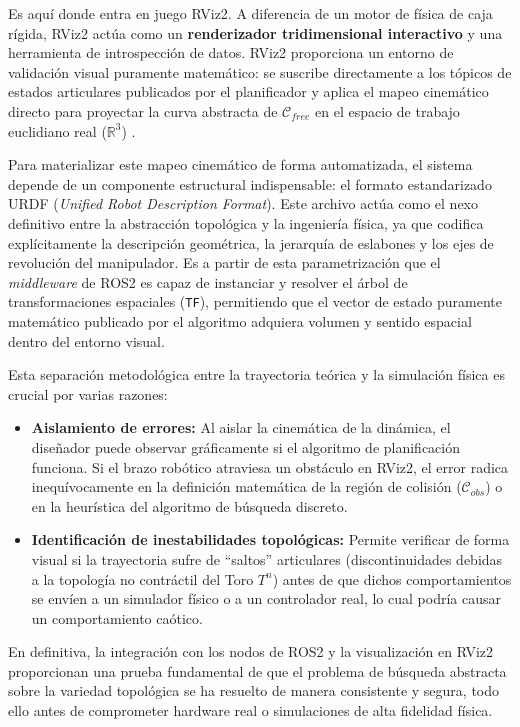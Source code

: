 Es aquí donde entra en juego RViz2. A diferencia de un motor de física de caja rígida, 
RViz2 actúa como un \textbf{renderizador tridimensional interactivo} y una herramienta de 
introspección de datos. RViz2 proporciona un entorno de validación visual puramente 
matemático: se suscribe directamente a los tópicos de estados articulares publicados 
por el planificador y aplica el mapeo cinemático directo para proyectar la curva abstracta 
de $\mathcal{C}_{free}$ en el espacio de trabajo euclidiano real ($\mathbb{R}^3$) \parencite{chitta2012moveit}.

Para materializar este mapeo cinemático de forma automatizada, el sistema depende de un 
componente estructural indispensable: el formato estandarizado URDF (\textit{Unified Robot 
Description Format}). Este archivo actúa como el nexo definitivo entre la abstracción topológica 
y la ingeniería física, ya que codifica explícitamente la descripción geométrica, la 
jerarquía de eslabones y los ejes de revolución del manipulador. Es a partir de esta parametrización 
que el \textit{middleware} de ROS2 es capaz de instanciar y resolver el árbol de 
transformaciones espaciales (\texttt{TF}), permitiendo que el vector de estado puramente 
matemático publicado por el algoritmo adquiera volumen y sentido espacial dentro del entorno visual.

Esta separación metodológica entre la trayectoria teórica y la simulación física es crucial 
por varias razones:
\begin{itemize}
\item \textbf{Aislamiento de errores:} Al aislar la cinemática de la dinámica, el diseñador puede 
observar gráficamente si el algoritmo de planificación funciona. Si el brazo robótico 
atraviesa un obstáculo en RViz2, el error radica inequívocamente en la definición matemática 
de la región de colisión ($\mathcal{C}_{obs}$) o en la heurística del algoritmo de búsqueda 
discreto.
\item \textbf{Identificación de inestabilidades topológicas:} Permite verificar de forma visual si 
la trayectoria sufre de \enquote{saltos} articulares (discontinuidades debidas a la topología no 
contráctil del Toro $T^n$) antes de que dichos comportamientos se envíen a un simulador físico o a 
un controlador real, lo cual podría causar un comportamiento caótico.
\end{itemize}

En definitiva, la integración con los nodos de ROS2 y la visualización en RViz2 
proporcionan una prueba fundamental de que el problema de búsqueda abstracta sobre 
la variedad topológica se ha resuelto de manera consistente y segura, todo ello antes de 
comprometer hardware real o simulaciones de alta fidelidad física.

